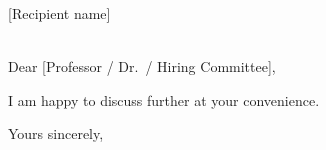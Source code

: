 \documentclass[a4paper,11pt]{letter}
\begin{document}
\begin{letter}{%
    [Recipient name] \\
    [Department / Institution] \\
    [Address]
}

\opening{Dear [Professor / Dr.\ / Hiring Committee],}







I am happy to discuss further at your convenience.

\closing{Yours sincerely,}

\end{letter}
\end{document}
